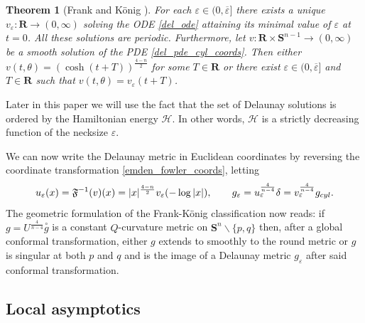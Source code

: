 \documentclass[reqno,11pt]{amsart}
\newtheorem{theorem}{Theorem}
\theoremstyle{tttheorem}
\newcommand{\Ss}{\mathbf{S}}
\newcommand{\R}{\mathbf{R}}
\begin{document}
\begin{theorem} [Frank and K\"onig \cite{FK}] 
For each $\varepsilon \in (0,\overline{\varepsilon}]$ there exists a 
unique $v_\varepsilon: \R \rightarrow (0,\infty)$ solving the 
ODE \eqref{del_ode} attaining its minimal value of $\varepsilon$ 
at $t=0$. All these solutions are periodic. 
Furthermore, let $v:\R \times \Ss^{n-1} \rightarrow (0,\infty)$ be a smooth 
solution of the PDE \eqref{del_pde_cyl_coords}. Then either 
$v(t,\theta) = (\cosh (t+T))^{\frac{4-n}{2}}$ for some $T \in \R$ 
or there exist $\varepsilon \in (0,\overline{\varepsilon}]$ and $T \in \R$
such that $v(t,\theta) = v_\varepsilon (t+T)$. 
\end{theorem}
Later in this paper we will use the fact that the set of Delaunay 
solutions is ordered by the Hamiltonian energy $\mathcal{H}$. In other 
words, $\mathcal{H}$ is a strictly decreasing function of the 
necksize $\varepsilon$. 

We can now write the Delaunay metric in Euclidean coordinates by 
reversing the coordinate transformation \eqref{emden_fowler_coords},
letting  
\begin{equation} \label{del_soln_eucl_coords} 
u_\varepsilon (x) = \mathfrak{F}^{-1}(v)(x) = |x|^{\frac{4-n}{2}} v_\varepsilon (-\log |x|), 
\qquad g_\varepsilon = u_\varepsilon^{\frac{4}{n-4}} \delta 
= v_\varepsilon^{\frac{4}{n-4}} g_{\rm cyl} .
\end{equation} 
The geometric formulation of the Frank-K\"onig classification 
now reads: if $g = U^{\frac{4}{n-4}} \overset{\circ}{g}$ is a constant 
$Q$-curvature metric on $\Ss^n \backslash \{ p,q\}$ then, after a 
global conformal transformation, 
either $g$ extends to smoothly to the round metric or $g$ is 
singular at both $p$ and $q$ and is the image of a Delaunay metric 
$g_\varepsilon$ after said conformal transformation. 

\subsection{Local asymptotics}
\end{document}
